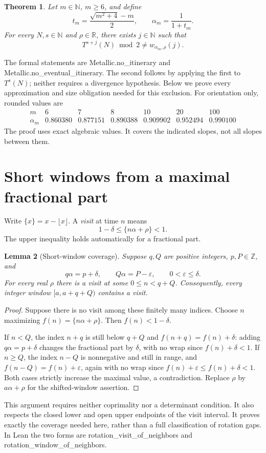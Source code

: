 \documentclass[11pt]{article}
\newtheorem{theorem}{Theorem}[section]
\newtheorem{lemma}[theorem]{Lemma}
\theoremstyle{remark}
\newcommand{\N}{\mathbb N}
\newcommand{\Z}{\mathbb Z}
\newcommand{\R}{\mathbb R}
\newcommand{\fr}[1]{\{#1\}}
\newcommand{\code}[1]{{\small\ttfamily #1}}
\begin{document}
\begin{theorem}\label{thm:main}
Let $m\in\N$, $m\ge6$, and define
\begin{equation}\label{eq:alpha}
t_m=\frac{\sqrt{m^2+4}-m}{2},\qquad
\alpha_m=\frac1{1+t_m}.
\end{equation}
For every $N,s\in\N$ and $\rho\in\R$, there exists $j\in\N$ such that
\[
T^{s+j}(N)\bmod2\ne w_{\alpha_m,\rho}(j).
\]
\end{theorem}
The formal statements are \code{Metallic.no\_\allowbreak{}itinerary}
and \code{Metallic.no\_\allowbreak{}eventual\_\allowbreak{}itinerary}.
The second follows by applying the first to $T^s(N)$; neither requires a
divergence hypothesis. Below we prove every approximation and size
obligation needed for this exclusion. For orientation only, rounded
values are
\[
\begin{array}{c|rrrrrr}
m&6&7&8&10&20&100\\\hline
\alpha_m&0.860380&0.877151&0.890388&0.909902&0.952494&0.990100
\end{array}
\]
The proof uses exact algebraic values. It covers the indicated slopes,
not all slopes between them.

\section{Short windows from a maximal fractional part}
Write $\fr{x}=x-\lfloor x\rfloor$. A \emph{visit} at time $n$ means
\[
1-\delta\le\fr{n\alpha+\rho}<1.
\]
The upper inequality holds automatically for a fractional part.

\begin{lemma}[Short-window coverage]\label{lem:window}
Suppose $q,Q$ are positive integers, $p,P\in\Z$, and
\begin{equation}\label{eq:bracket}
q\alpha=p+\delta,\qquad Q\alpha=P-\varepsilon,
\qquad 0<\varepsilon\le\delta.
\end{equation}
For every real $\rho$ there is a visit at some $0\le n<q+Q$.
Consequently, every integer window $[a,a+q+Q)$ contains a visit.
\end{lemma}
\begin{proof}
Suppose there is no visit among these finitely many indices. Choose $n$
maximizing $f(n)=\fr{n\alpha+\rho}$. Then $f(n)<1-\delta$.

If $n<Q$, the index $n+q$ is still below $q+Q$ and
$f(n+q)=f(n)+\delta$: adding $q\alpha=p+\delta$ changes the fractional
part by $\delta$, with no wrap since $f(n)+\delta<1$.
If $n\ge Q$, the index $n-Q$ is nonnegative and still in range, and
$f(n-Q)=f(n)+\varepsilon$, again with no wrap since
$f(n)+\varepsilon\le f(n)+\delta<1$.
Both cases strictly increase the maximal value, a contradiction.
Replace $\rho$ by $a\alpha+\rho$ for the shifted-window assertion.
\end{proof}
This argument requires neither coprimality nor a determinant condition.
It also respects the closed lower and open upper endpoints of the visit
interval. It proves exactly the coverage needed here, rather than a full
classification of rotation gaps. In Lean the two forms are
\code{rotation\_\allowbreak{}visit\_\allowbreak{}of\_\allowbreak{}neighbors}
and \code{rotation\_\allowbreak{}window\_\allowbreak{}of\_\allowbreak{}neighbors}.
\end{document}
